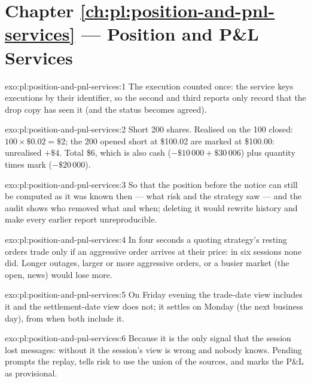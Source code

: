 \section*{Chapter \ref{ch:pl:position-and-pnl-services} --- Position and P\&L Services}

\begin{solution}{exo:pl:position-and-pnl-services:1}
The execution counted once: the service keys executions by their identifier, so the second and third reports only record that the drop copy
has seen it (and the status becomes agreed).
\end{solution}

\begin{solution}{exo:pl:position-and-pnl-services:2}
Short 200 shares. Realised on the 100 closed: $100 \times \$0.02 = \$2$; the 200 opened short at \$100.02 are marked at \$100.00: unrealised
$+\$4$. Total \$6, which is also cash ($-\$10\,000 + \$30\,006$) plus quantity times mark ($-\$20\,000$).
\end{solution}

\begin{solution}{exo:pl:position-and-pnl-services:3}
So that the position before the notice can still be computed as it was known then --- what risk and the strategy saw --- and the audit shows
who removed what and when; deleting it would rewrite history and make every earlier report unreproducible.
\end{solution}

\begin{solution}{exo:pl:position-and-pnl-services:4}
In four seconds a quoting strategy's resting orders trade only if an aggressive order arrives at their price: in six sessions none did. Longer
outages, larger or more aggressive orders, or a busier market (the open, news) would lose more.
\end{solution}

\begin{solution}{exo:pl:position-and-pnl-services:5}
On Friday evening the trade-date view includes it and the settlement-date view does not; it settles on Monday (the next business day), from
when both include it.
\end{solution}

\begin{solution}{exo:pl:position-and-pnl-services:6}
Because it is the only signal that the session lost messages: without it the session's view is wrong and nobody knows. Pending prompts the
replay, tells risk to use the union of the sources, and marks the P\&L as provisional.
\end{solution}

